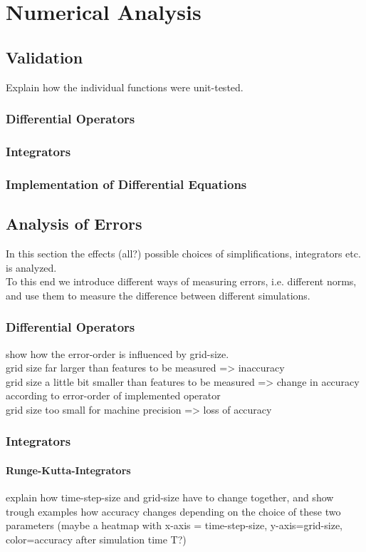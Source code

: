 \chapter{Numerical Analysis}
\section{Validation}
Explain how the individual functions were unit-tested.
\subsection{Differential Operators}
\subsection{Integrators}
\subsection{Implementation of Differential Equations}

\section{Analysis of Errors}\label{chapter:introduction}
In this section the effects (all?) possible choices of simplifications, integrators etc. is analyzed.\\
To this end we introduce different ways of measuring errors, i.e. different norms, and use them to measure the difference between different simulations.

\subsection{Differential Operators}
show how the error-order is influenced by grid-size.\\
grid size far larger than features to be measured => inaccuracy\\
grid size a little bit smaller than features to be measured => change in accuracy according to error-order of implemented operator\\
grid size too small for machine precision => loss of accuracy

\subsection{Integrators}
\subsubsection{Runge-Kutta-Integrators}
explain how time-step-size and grid-size have to change together, and show trough examples how accuracy changes depending on the choice of these two parameters (maybe a heatmap with x-axis = time-step-size, y-axis=grid-size, color=accuracy after simulation time T?)
